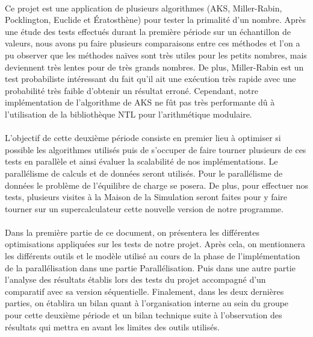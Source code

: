 	\paragraph{}Ce projet est une application de plusieurs algorithmes (AKS, Miller-Rabin, Pocklington, Euclide et Ératosthène) pour tester la primalité d'un nombre. Après une étude des tests effectués durant la première période sur un échantillon de valeurs, nous avons pu faire plusieurs comparaisons entre ces méthodes et l'on a pu observer que les méthodes naïves sont très utiles pour les petits nombres, mais deviennent très lentes pour de très grands nombres. De plus, Miller-Rabin est un test probabiliste intéressant du fait qu'il ait une exécution très rapide avec une probabilité très faible d'obtenir un résultat erroné. Cependant, notre implémentation de l'algorithme de AKS ne fût pas très performante dû à l'utilisation de la bibliothèque NTL pour l'arithmétique modulaire.
	
	\paragraph{}L'objectif de cette deuxième période consiste en premier lieu à optimiser si possible les algorithmes utilisés puis de s’occuper de faire tourner plusieurs de ces tests en parallèle et ainsi évaluer la scalabilité de nos implémentations. Le parallélisme de calculs et de données seront utilisés. Pour le parallélisme de données le problème de l'équilibre de charge se posera. De plus, pour effectuer nos tests, plusieurs visites à la Maison de la Simulation seront faites pour y faire tourner sur un supercalculateur cette nouvelle version de notre programme. 
	
	\paragraph{}Dans la première partie de ce document, on présentera les différentes optimisations appliquées sur les tests de notre projet.
	Après cela, on mentionnera les différents outils et le modèle utilisé au cours de la phase de l'implémentation de la parallélisation dans une partie Parallélisation. Puis dans une autre partie l'analyse des résultats établis lors des tests du projet accompagné d'un comparatif avec sa version séquentielle.
	Finalement, dans les deux dernières parties, on établira un bilan quant à l'organisation interne au sein du groupe pour cette deuxième période et un bilan technique suite à l'observation des résultats qui mettra en avant les limites des outils utilisés.
	
